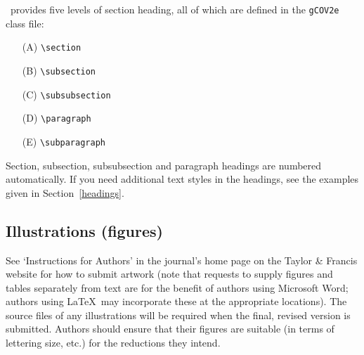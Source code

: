 \documentclass{gCOV2e}
\theoremstyle{plain}%
\theoremstyle{definition}
\theoremstyle{remark}
\begin{document}
\LaTeXe\ provides five levels of section heading, all of which are defined in the \texttt{gCOV2e} class file:
\begin{enumerate}
  \item[(A)] \verb"\section"
  \item[(B)] \verb"\subsection"
  \item[(C)] \verb"\subsubsection"
  \item[(D)] \verb"\paragraph"
  \item[(E)] \verb"\subparagraph"
\end{enumerate}
Section, subsection, subsubsection and paragraph headings are numbered automatically.
If you need additional text styles in the headings, see the examples given in Section~\ref{headings}.


\subsection{Illustrations (figures)}

See `Instructions for Authors' in the journal's home page on the Taylor \& Francis website for how to submit artwork (note that requests to supply figures and tables separately from text are for the benefit of authors using Microsoft Word; authors using \LaTeX\ may incorporate these at the appropriate locations). The source files of any illustrations will be required when the final, revised version is submitted. Authors should ensure that their figures are suitable (in terms of lettering size, etc.) for the reductions they intend.
\end{document}

